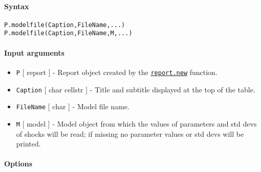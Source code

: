 


	\paragraph{Syntax}

\begin{verbatim}
P.modelfile(Caption,FileName,...)
P.modelfile(Caption,FileName,M,...)
\end{verbatim}

\paragraph{Input arguments}

\begin{itemize}
\item
  \texttt{P} {[} report {]} - Report object created by the
  \href{report/new}{\texttt{report.new}} function.
\item
  \texttt{Caption} {[} char \textbar{} cellstr {]} - Title and subtitle
  displayed at the top of the table.
\item
  \texttt{FileName} {[} char {]} - Model file name.
\item
  \texttt{M} {[} model {]} - Model object from which the values of
  parameters and std devs of shocks will be read; if missing no
  parameter values or std devs will be printed.
\end{itemize}

\paragraph{Options}

